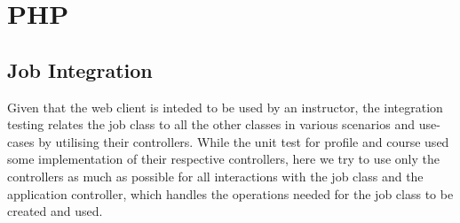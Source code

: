 \documentclass[12pt]{report}
\begin{document}
\section{PHP}
\subsection{Job Integration}
	Given that the web client is inteded to be used by an instructor, the integration testing relates the job class to all the other classes in various scenarios and use-cases by utilising their controllers. While the unit test for profile and course used some implementation of their respective controllers, here we try to use only the controllers as much as possible for all interactions with the job class and the application controller, which handles the operations needed for the job class to be created and used. 
\end{document}
